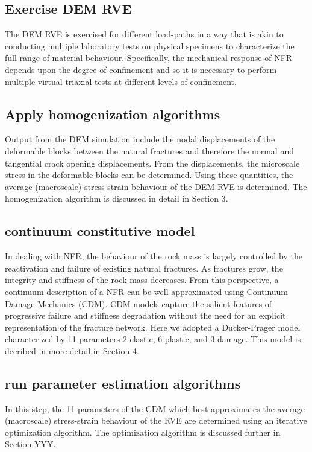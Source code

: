 \subsection*{Exercise DEM RVE}
The DEM RVE is exercised for different load-paths in a way that is akin  to conducting multiple laboratory tests on physical specimens to characterize the full range of material behaviour. Specifically, the mechanical response of NFR depends upon the degree of confinement and so it is necessary to perform multiple virtual triaxial tests at different levels of confinement. 

\subsection*{Apply homogenization algorithms}
Output from the DEM simulation include the nodal displacements of the deformable blocks between the natural fractures and therefore the normal and tangential crack opening displacements. From the displacements, the microscale stress in the deformable blocks can be determined.  Using these quantities, the average (macroscale) stress-strain behaviour of the DEM RVE is determined. The homogenization algorithm is discussed in detail in Section 3.

\subsection*{continuum constitutive model}
In dealing with NFR, the behaviour of the rock mass is largely controlled by the reactivation and failure of existing natural fractures. As fractures grow, the integrity and stiffness of the rock mass decreases. From this perspective, a continuum description of a NFR can be well approximated using Continuum Damage Mechanics (CDM). CDM models capture the salient features of progressive failure and stiffness degradation without the need for an explicit representation of the fracture network. Here we adopted a Ducker-Prager model characterized by 11 parameters-2 elastic, 6 plastic, and 3 damage. This model is decribed in more detail in Section 4.

\subsection*{run parameter estimation algorithms}
In this step, the 11 parameters of the CDM which best approximates the average (macroscale) stress-strain behaviour of the RVE are determined using an iterative optimization algorithm. The optimization algorithm is discussed further in Section YYY.

